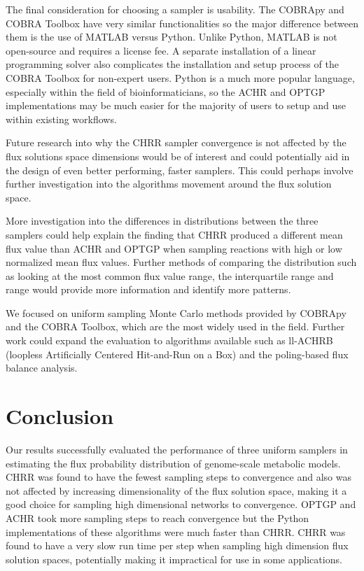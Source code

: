 \documentclass[10pt,letterpaper]{article}
\begin{document}
The final consideration for choosing a sampler is usability. The COBRApy and COBRA Toolbox have very similar functionalities so the major difference between them is the use of MATLAB versus Python. Unlike Python, MATLAB is not open-source and requires a license fee. A separate installation of a linear programming solver also complicates the installation and setup process of the COBRA Toolbox for non-expert users. Python is a much more popular language, especially within the field of bioinformaticians, so the ACHR and OPTGP implementations may be much easier for the majority of users to setup and use within existing workflows.

Future research into why the CHRR sampler convergence is not affected by the flux solutions space dimensions would be of interest and could potentially aid in the design of even better performing, faster samplers. This could perhaps involve further investigation into the algorithms movement around the flux solution space.

More investigation into the differences in distributions between the three samplers could help explain the finding that CHRR produced a different mean flux value than ACHR and OPTGP when sampling reactions with high or low normalized mean flux values. Further methods of comparing the distribution such as looking at the most common flux value range, the interquartile range and range would provide more information and identify more patterns. 

We focused on uniform sampling Monte Carlo methods provided by COBRApy and the COBRA Toolbox, which are the most widely used in the field. Further work could expand the evaluation to algorithms available such as ll-ACHRB (loopless Artificially Centered Hit-and-Run on a Box)\cite{Saa} and the poling-based flux balance analysis\cite{Binns}. 

\section*{Conclusion}
Our results successfully evaluated the performance of three uniform samplers in estimating the flux probability distribution of genome-scale metabolic models. CHRR was found to have the fewest sampling steps to convergence and also was not affected by increasing dimensionality of the flux solution space, making it a good choice for sampling high dimensional networks to convergence. OPTGP and ACHR took more sampling steps to reach convergence but the Python implementations of these algorithms were much faster than CHRR. CHRR was found to have a very slow run time per step when sampling high dimension flux solution spaces, potentially making it impractical for use in some applications.
\end{document}

